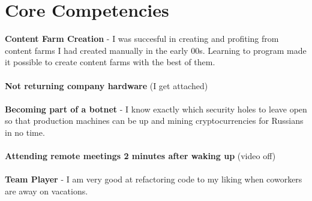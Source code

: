 \documentclass[10pt]{article} %
\begin{document}
\begin{minipage}[t]{0.44\textwidth}
\section{Core Competencies} 
    \normalsize{\textbf{Content Farm Creation} - I was succesful in creating and profiting from content farms I had created manually in the early 00s. Learning to program made it possible to create content farms with the best of them.}\\
\\
    \normalsize{\textbf{Not returning company hardware} (I get attached) }\\
\\
\normalsize{\textbf{Becoming part of a botnet} - I know exactly which security holes to leave open so that production machines can be up and mining cryptocurrencies for Russians in no time. }\\
\\
    \normalsize{\textbf{Attending remote meetings 2 minutes after waking up} (video off) }\\
\\
    \normalsize{\textbf{Team Player} - I am very good at refactoring code to my liking when coworkers are away on vacations.}\\
\\







	
\end{minipage} %
\end{document}
